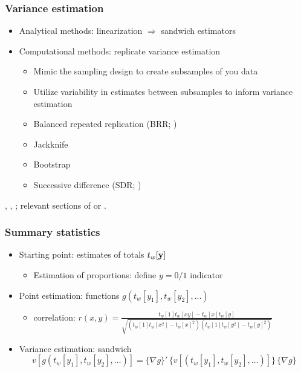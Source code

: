 \documentclass{beamer}
\begin{document}
\begin{frame}\frametitle{Variance estimation}

\begin{itemize}
    \item Analytical methods: linearization $\Rightarrow$ sandwich estimators
    \item Computational methods: replicate variance estimation
    \begin{itemize}
        \item Mimic the sampling design to create subsamples of you data
        \item Utilize variability in estimates between subsamples to inform variance estimation
        \item Balanced repeated replication (BRR; \citet{mccarthy:1969})
        \item Jackknife \citep{krewski:rao:1981}
        \item Bootstrap \citep{rao:wu:1988,sitter:1992:3bs}
        \item Successive difference (SDR; \citet{ash:2011})
    \end{itemize}
\end{itemize}

\bigskip

\citet{shao:1996}, \citet{rust:rao:1996}, \citet{kolenikov:2010}; 
relevant sections of \citet{heeringa:west:berglund:2017} or \citet{lumley:2010}.

\end{frame}


\begin{frame}\frametitle{Summary statistics}

\begin{itemize}
    \item Starting point: estimates of totals $t_w[{\bf y}]$
        \begin{itemize} \item Estimation of proportions: define $y=0/1$ indicator \end{itemize}
    \item Point estimation: functions $g(t_w[y_1], t_w[y_2], \ldots)$
        \begin{itemize}
            \item correlation: $r(x,y) = \frac{t_w[1]t_w[xy]-t_w[x]t_w[y]}%
                {\sqrt{(t_w[1]t_w[x^2]-t_w[x]^2)(t_w[1]t_w[y^2]-t_w[y]^2)}}$
        \end{itemize}
    \item Variance estimation: sandwich
        $$
            v[g(t_w[y_1], t_w[y_2], \ldots)] = \{\nabla g\}' \, \{ v[(t_w[y_1], t_w[y_2], \ldots)] \} \, \{\nabla g \}
        $$
\end{itemize}

\end{frame}
\end{document}
